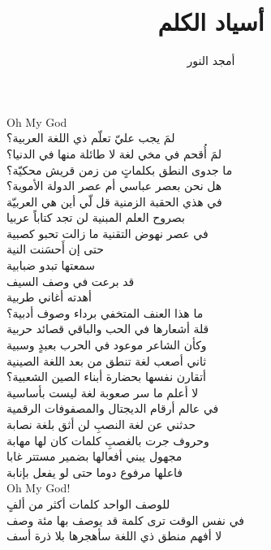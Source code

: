 \documentclass[letterpaper,12pt]{article}
\begin{document}
\title{\textbf{\Large \textarabic{أسياد الكلم}}}
\author{\textarabic{أمجد النور}}
\date{}
\maketitle


\begin{tcolorbox}[colback=boxcolor,colframe=headercolor,title=\textbf{Stanza 1},breakable]
Oh My God \\
\textarabic{
لمَ يجب عليّ تعلّم ذي اللغة العربية؟ \\
لمَ أُقحم في مخي لغة لا طائلة منها في الدنيا؟ \\
ما جدوى النطق بكلماتٍ من زمن قريش محكيّة؟ \\
هل نحن بعصر عباسي أم عصر الدولة الأموية؟ \\
في هذي الحقبة الزمنية قل لّي أين هي العربيّة \\
بصروح العلم المبنية لن تجد كتاباً عربيا \\
في عصر نهوض التقنية ما زالت تحبو كصبية \\
حتى إن أَحسَنت النية \\
سمعتها تبدو ضبابية \\
قد برعت في وصف السيف \\
أهدته أغاني طربية \\
ما هذا العنف المتخفي برداء وصوف أدبية؟ \\
قلة أشعارها في الحب والباقي قصائد حربية \\
وكأن الشاعر موعود في الحرب بعبدٍ وسبية \\
ثاني أصعب لغة تنطق من بعد اللغة الصينية \\
أتقارن نفسها بحضارة أبناء الصين الشعبية؟ \\
لا أعلم ما سر صعوبة لغة ليست بأساسية \\
في عالم أرقام الديجتال والمصفوفات الرقمية \\
حدثني عن لغة النصبِ لن أثق بلغة نصابة \\
وحروف جرت بالغصبِ كلمات كان لها مهابة \\
مجهول يبني أفعالها بضمير مستتر غابا \\
فاعلها مرفوع دوما حتى لو يفعل بإنابة \\
}
Oh My God! \\
\textarabic{
للوصف الواحد كلمات أكثر من ألفٍ \\
في نفس الوقت ترى كلمة قد يوصف بها مئة وصف \\
لا أفهم منطق ذي اللغة سأهجرها بلا ذرة أسف \\
}
\end{tcolorbox}
\end{document}
